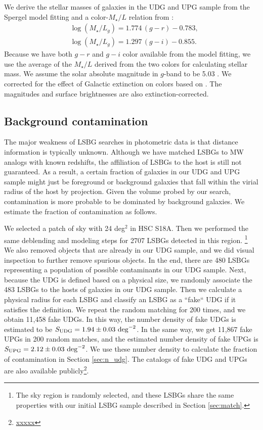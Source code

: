 \documentclass[twocolumn,astrosymb,twocolappendix]{aastex631}
\begin{document}
\begin{CJK*}{UTF8}{gbsn}
We derive the stellar masses of galaxies in the UDG and UPG sample from the Spergel model fitting and a color-$M_{\star}/L$ relation from \citet{Into2013}:
\begin{align*}
&\log \left(M_{\star} / L_{g}\right)=1.774\,(g-r)-0.783, \\
&\log \left(M_{\star} / L_{g}\right)=1.297\,(g-i)-0.855.
\end{align*}
Because we have both $g-r$ and $g-i$ color available from the model fitting, we use the average of the $M_{\star}/L$ derived from the two colors for calculating stellar mass. We assume the solar absolute magnitude in $g$-band to be 5.03 \citep{Willmer2018}. We corrected for the effect of Galactic extinction on colors based on \citet{SFD1998,Schlafly2011}. The magnitudes and surface brightnesses are also extinction-corrected. 


\subsection{Background contamination}\label{sec:bkg}
The major weakness of LSBG searches in photometric data is that distance information is typically unknown. Although we have matched LSBGs to MW analogs with known redshifts, the affiliation of LSBGs to the host is still not guaranteed. As a result, a certain fraction of galaxies in our UDG and UPG sample might just be foreground or background galaxies that fall within the virial radius of the host by projection. Given the volume probed by our search, contamination is more probable to be dominated by background galaxies. We estimate the fraction of contamination as follows.

We selected a patch of sky with 24 deg$^{2}$ in HSC S18A. Then we performed the same deblending and modeling steps for 2707 LSBGs detected in this region. \footnote{The sky region is randomly selected, and these LSBGs share the same properties with our initial LSBG sample described in Section \ref{sec:match}.} We also removed objects that are already in our UDG sample, and we did visual inspection to further remove spurious objects. In the end, there are 480 LSBGs representing a population of possible contaminants in our UDG sample. Next, because the UDG is defined based on a physical size, we randomly associate the 483 LSBGs to the hosts of galaxies in our UDG sample. Then we calculate a physical radius for each LSBG and classify an LSBG as a ``fake`` UDG if it satisfies the definition. We repeat the random matching for 200 times, and we obtain 11,458 fake UDGs. In this way, the number density of fake UDGs is estimated to be $S_{\rm UDG} = 1.94\pm0.03\ \mathrm{deg}^{-2}$. In the same way, we get 11,867 fake UPGs in 200 random matches, and the estimated number density of fake UPGs is $S_{\rm UPG} = 2.12\pm0.03\ \mathrm{deg}^{-2}$. We use these number density to calculate the fraction of contamination in Section \ref{sec:n_udg}. The catalogs of fake UDG and UPGs are also available publicly\footnote{\url{xxxxx}}.



\end{CJK*}
\end{document}
